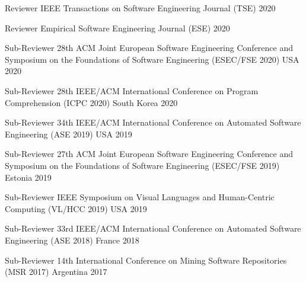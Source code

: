 \begin{cvhonors}

  \cvhonor
    {Reviewer} %
    {{IEEE} Transactions on Software Engineering Journal ({TSE})} %
    {} %
    {2020} %

  \cvhonor
    {Reviewer} %
    {Empirical Software Engineering Journal ({ESE})} %
    {} %
    {2020} %

  \cvhonor
    {Sub-Reviewer} %
    {28th {ACM} Joint European Software Engineering Conference and Symposium on the Foundations of Software Engineering ({ESEC/FSE} 2020)} %
    {USA} %
    {2020} %

  \cvhonor
    {Sub-Reviewer} %
    {28th {IEEE}/{ACM} International Conference on Program Comprehension ({ICPC} 2020)} %
    {South Korea} %
    {2020} %

  \cvhonor
    {Sub-Reviewer} %
    {34th {IEEE}/{ACM} International Conference on Automated Software Engineering ({ASE} 2019)} %
    {USA} %
    {2019} %

  \cvhonor
    {Sub-Reviewer} %
    {27th {ACM} Joint European Software Engineering Conference and Symposium on the Foundations of Software Engineering ({ESEC/FSE} 2019)} %
    {Estonia} %
    {2019} %

  \cvhonor
    {Sub-Reviewer} %
    {{IEEE} Symposium on Visual Languages and Human-Centric Computing ({VL/HCC} 2019)} %
    {USA} %
    {2019} %

  \cvhonor
    {Sub-Reviewer} %
    {33rd {IEEE}/{ACM} International Conference on Automated Software Engineering ({ASE} 2018)} %
    {France} %
    {2018} %

  \cvhonor
    {Sub-Reviewer} %
    {14th International Conference on Mining Software Repositories ({MSR} 2017)} %
    {Argentina} %
    {2017} %


\end{cvhonors}

